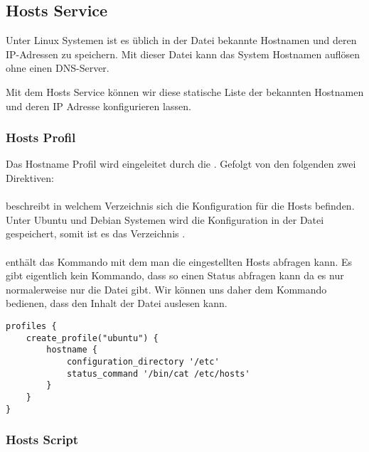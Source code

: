 \subsection{Hosts Service}

Unter Linux Systemen ist es üblich in der  Datei bekannte
Hostnamen und deren IP-Adressen zu speichern. Mit dieser Datei kann das System
Hostnamen auflösen ohne einen DNS-Server.

Mit dem Hosts Service können wir diese statische Liste der bekannten Hostnamen und
deren IP Adresse konfigurieren lassen.

\subsubsection{Hosts Profil}

Das Hostname Profil wird eingeleitet durch die . Gefolgt von
den folgenden zwei Direktiven:

\paragraph{}

beschreibt in welchem Verzeichnis
sich die Konfiguration für die Hosts befinden. Unter Ubuntu und Debian
Systemen wird die Konfiguration in der Datei  gespeichert,
somit ist es das Verzeichnis .

\paragraph{}

enthält das Kommando mit dem man die eingestellten Hosts abfragen kann. Es gibt
eigentlich kein Kommando, dass so einen Status abfragen kann da es nur normalerweise
nur die Datei  gibt. Wir können uns daher dem Kommando 
bedienen, dass den Inhalt der Datei  auslesen kann.

\begin{lstlisting}[style=Java, caption=Beispiel Hosts Profil Ubuntu Server]
profiles {
	create_profile("ubuntu") {
		hostname {
			configuration_directory '/etc'
			status_command '/bin/cat /etc/hosts'
		}
	}
}
\end{lstlisting}

\subsubsection{Hosts Script}


